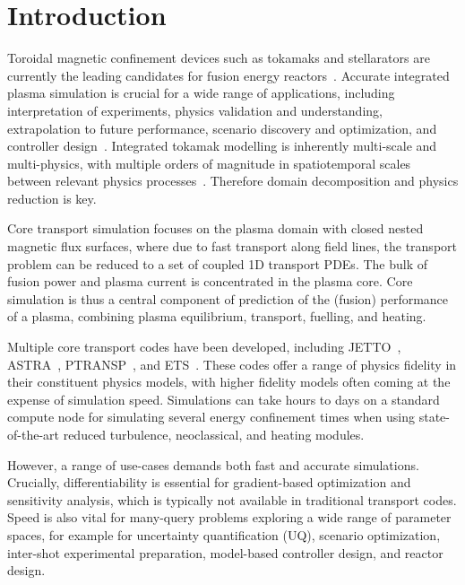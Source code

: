 \documentclass[aps, reprint, nofootinbib]{revtex4-2}
\begin{document}

\maketitle

\section{Introduction}

Toroidal magnetic confinement devices such as tokamaks and stellarators are currently the leading candidates for fusion energy reactors~\cite{ongena:2016}. Accurate integrated plasma simulation is crucial for a wide range of applications, including interpretation of experiments, physics validation and understanding, extrapolation to future performance, scenario discovery and optimization, and controller design~\cite{poli:2018}. Integrated tokamak modelling is inherently multi-scale and multi-physics, with multiple orders of magnitude in spatiotemporal scales between relevant physics processes~\cite{fasoli:2016}. Therefore domain decomposition and physics reduction is key. 

Core transport simulation focuses on the plasma domain with closed nested magnetic flux surfaces, where due to fast transport along field lines, the transport problem can be reduced to a set of coupled 1D transport PDEs. The bulk of fusion power and plasma current is concentrated in the plasma core. Core simulation is thus a central component of  prediction of the (fusion) performance of a plasma, combining plasma equilibrium, transport, fuelling, and heating. 

Multiple core transport codes have been developed, including JETTO~\cite{cenacchi:1988}, ASTRA~\cite{pereverzev:1991}, PTRANSP~\cite{transp:2018}, and ETS~\cite{kalupin:2013}. These codes offer a range of physics fidelity in their constituent physics models, with higher fidelity models often coming at the expense of simulation speed. Simulations can take hours to days on a standard compute node for simulating several energy confinement times when using state-of-the-art reduced turbulence, neoclassical, and heating modules. 

However, a range of use-cases demands both fast and accurate simulations.  Crucially, differentiability is essential for gradient-based optimization and sensitivity analysis, which is typically not available in traditional transport codes.  Speed is also vital for many-query problems exploring a wide range of parameter spaces, for example for uncertainty quantification (UQ), scenario optimization, inter-shot experimental preparation, model-based controller design, and reactor design.
\end{document}
